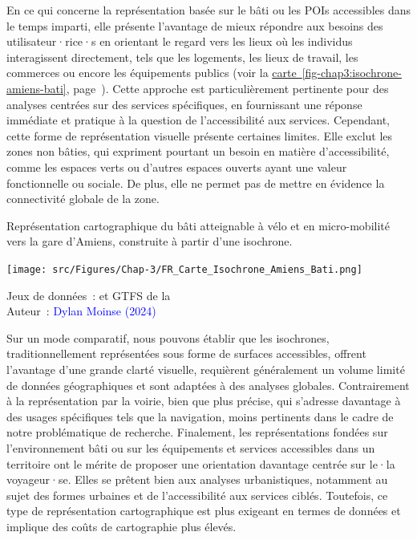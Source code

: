 \begin{refsegment}
En ce qui concerne la représentation basée sur le bâti ou les \acrshort{POIs} accessibles dans le temps imparti, elle présente l’avantage de mieux répondre aux besoins des utilisateur·rice·s en orientant le regard vers les lieux où les individus interagissent directement, tels que les logements, les lieux de travail, les commerces ou encore les équipements publics (voir la \hyperref[fig-chap3:isochrone-amiens-bati]{carte~\ref{fig-chap3:isochrone-amiens-bati}}, page~\pageref{fig-chap3:isochrone-amiens-bati}). Cette approche est particulièrement pertinente pour des analyses centrées sur des services spécifiques, en fournissant une réponse immédiate et pratique à la question de l'accessibilité aux services. Cependant, cette forme de représentation visuelle présente certaines limites. Elle exclut les zones non bâties, qui expriment pourtant un besoin en matière d'accessibilité, comme les espaces verts ou d’autres espaces ouverts ayant une valeur fonctionnelle ou sociale. De plus, elle ne permet pas de mettre en évidence la connectivité globale de la zone.%

    \begin{carte}[h!]\vspace*{4pt}
        \caption{Représentation cartographique du bâti atteignable à vélo et en micro-mobilité vers la gare d'Amiens, construite à partir d'une isochrone.}
        \label{fig-chap3:isochrone-amiens-bati}
        \centerline{\texttt{[image: src/Figures/Chap-3/FR\_Carte\_Isochrone\_Amiens\_Bati.png]}}
        \vspace{5pt}
        \begin{flushright}\scriptsize{
        Jeux de données~: \textcolor{blue}{\textcite{openstreetmap_openstreetmap_2023}} et \acrshort{GTFS} de la \textcolor{blue}{\textcite{sncf_reseau_2024}}
        \\
        Auteur~: \textcolor{blue}{Dylan Moinse (2024)}
        }\end{flushright}
    \end{carte}

Sur un mode comparatif, nous pouvons établir que les isochrones, traditionnellement représentées sous forme de surfaces accessibles, offrent l’avantage d’une grande clarté visuelle, requièrent généralement un volume limité de données géographiques et sont adaptées à des analyses globales. Contrairement à la représentation par la voirie, bien que plus précise, qui s’adresse davantage à des usages spécifiques tels que la navigation, moins pertinents dans le cadre de notre problématique de recherche. Finalement, les représentations fondées sur l’environnement bâti ou sur les équipements et services accessibles dans un territoire ont le mérite de proposer une orientation davantage centrée sur le·la voyageur·se. Elles se prêtent bien aux analyses urbanistiques, notamment au sujet des formes urbaines et de l’accessibilité aux services ciblés. Toutefois, ce type de représentation cartographique est plus exigeant en termes de données et implique des coûts de \gls{cartographie} plus élevés.%


\end{refsegment}
